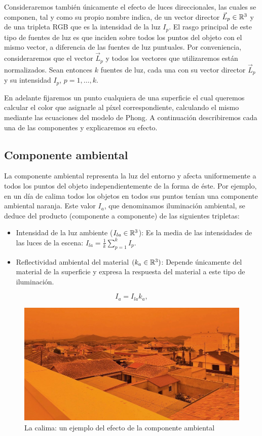 Consideraremos también únicamente el efecto de luces direccionales, las cuales se componen, tal y como su propio nombre indica, de un vector director $\vec L_p\in\mathbb{R}^3$ y de una tripleta RGB que es la intensidad de la luz $I_p$. El rasgo principal de este tipo de fuentes de luz es que inciden sobre todos los puntos del objeto con el mismo vector, a diferencia de las fuentes de luz puntuales. Por conveniencia, consideraremos que el vector $\vec L_p$ y todos los vectores que utilizaremos están normalizados. Sean entonces $k$ fuentes de luz, cada una con su vector director $\vec L_p$ y su intensidad $I_p$, $p=1,\dots,k$.

En adelante fijaremos un punto cualquiera de una superficie el cual queremos calcular el color que asignarle al píxel correspondiente, calculando el mismo mediante las ecuaciones del modelo de Phong. A continuación describiremos cada una de las componentes y explicaremos su efecto.

\subsection{Componente ambiental}

La componente ambiental representa la luz del entorno y afecta uniformemente a todos los puntos del objeto independientemente de la forma de éste. Por ejemplo, en un día de calima todos los objetos en todos sus puntos tenían una componente ambiental naranja. Este valor $I_a$, que denominamos iluminación ambiental, se deduce del producto (componente a componente) de las siguientes tripletas:
\begin{itemize}
    \item Intensidad de la luz ambiente ($I_{la}\in\mathbb{R}^3$): Es la media de las intensidades de las luces de la escena: $I_{la}=\frac{1}{k}\sum_{p=1}^k I_p$.
    \item Reflectividad ambiental del material $(k_a\in\mathbb{R}^3)$: Depende únicamente del material de la superficie y expresa la respuesta del material a este tipo de iluminación. 
\end{itemize}
\begin{equation}
    I_a = I_{la} k_a,
\end{equation}

\begin{figure} [ht]
    \centering
    \includegraphics[scale = 0.2]{img/C7/calima.jpg}
    \caption{La calima: un ejemplo del efecto de la componente ambiental}
    \label{fig:calima}
\end{figure}


